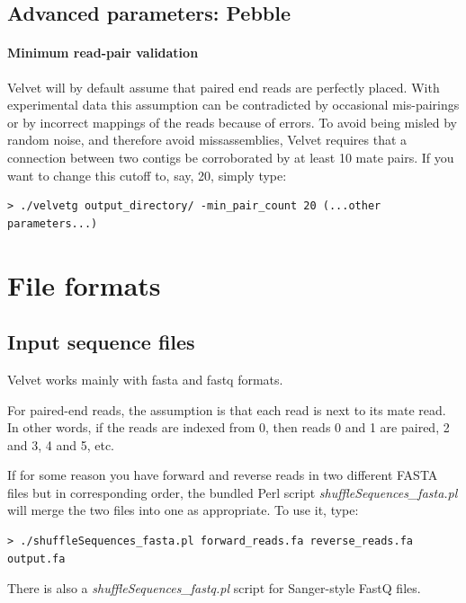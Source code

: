 \documentclass{article}
\begin{document}
\subsection{Advanced parameters: Pebble}

\paragraph{Minimum read-pair validation}

Velvet will by default assume that paired end reads are perfectly placed. With experimental data this assumption can be contradicted by occasional mis-pairings or by incorrect mappings of the reads because of errors. To avoid being misled by random noise, and therefore avoid missassemblies, Velvet requires that a connection between two contigs be corroborated by at least 10 mate pairs. If you want to change this cutoff to, say, 20, simply type:

\begin{verbatim}
> ./velvetg output_directory/ -min_pair_count 20 (...other parameters...)
\end{verbatim}  

\section{File formats}

\subsection{Input sequence files}

\label{sec:pairedformat}

Velvet works mainly with fasta and fastq formats. 

For paired-end reads, the assumption is that each read is next to its mate
read. In other words, if the reads are indexed from 0, then reads 0 and 1 are
paired, 2 and 3, 4 and 5, etc.  

If for some reason you have forward and reverse reads in two different FASTA files
but in corresponding order, the bundled Perl script \emph{shuffleSequences\_fasta.pl} will
merge the two files into one as appropriate. To use it, type:
\begin{verbatim}
> ./shuffleSequences_fasta.pl forward_reads.fa reverse_reads.fa output.fa
\end{verbatim}

There is also a \emph{shuffleSequences\_fastq.pl} script for Sanger-style FastQ files.
\end{document}
